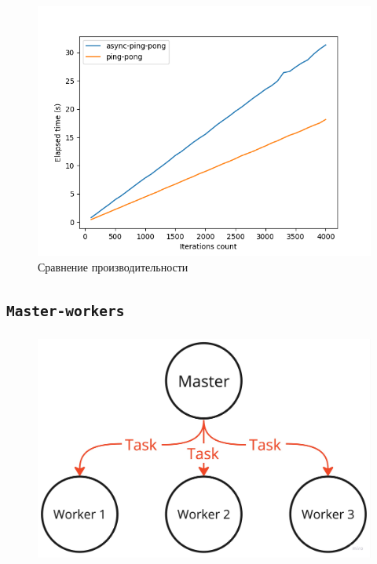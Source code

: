 \documentclass[t]{beamer}  %
\begin{document}
 \begin{frame}[fragile]
	\frametitle{\insertsection} 
	\framesubtitle{\insertsubsection}
	\vspace{-0.8cm}
	\begin{figure}
		\includegraphics[width=0.8\linewidth]{images/async-ping-pong}
		\caption*{Сравнение производительности}
	\end{figure}
 \end{frame}

 \subsection{\texttt{Master-workers}}

 \begin{frame}[fragile]
	\frametitle{\insertsection} 
	\framesubtitle{\insertsubsection}

	\begin{figure}[H]
		\centering
		\includegraphics[width=0.5\linewidth]{images/master_workers_scheme}
	\end{figure}
 \end{frame}
\end{document}
